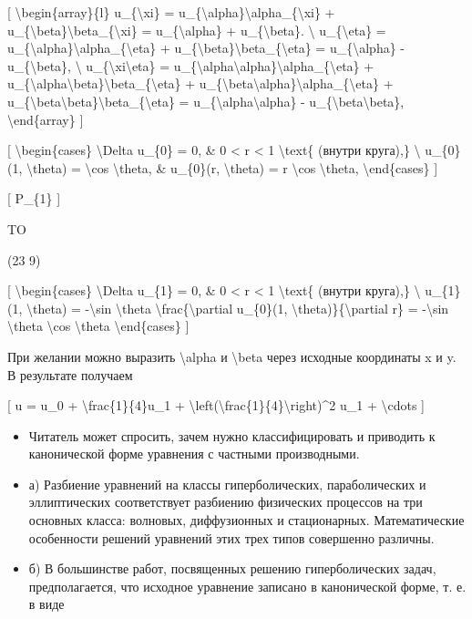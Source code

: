 \documentclass[
]{article}
\begin{document}
{[} \textbackslash begin\{array\}\{l\} u\_\{\textbackslash xi\} =
u\_\{\textbackslash alpha\}\textbackslash alpha\_\{\textbackslash xi\} +
u\_\{\textbackslash beta\}\textbackslash beta\_\{\textbackslash xi\} =
u\_\{\textbackslash alpha\} + u\_\{\textbackslash beta\}.
\textbackslash{} u\_\{\textbackslash eta\} =
u\_\{\textbackslash alpha\}\textbackslash alpha\_\{\textbackslash eta\}
+ u\_\{\textbackslash beta\}\textbackslash beta\_\{\textbackslash eta\}
= u\_\{\textbackslash alpha\} - u\_\{\textbackslash beta\},
\textbackslash{} u\_\{\textbackslash xi\textbackslash eta\} =
u\_\{\textbackslash alpha\textbackslash alpha\}\textbackslash alpha\_\{\textbackslash eta\}
+
u\_\{\textbackslash alpha\textbackslash beta\}\textbackslash beta\_\{\textbackslash eta\}
+
u\_\{\textbackslash beta\textbackslash alpha\}\textbackslash alpha\_\{\textbackslash eta\}
+
u\_\{\textbackslash beta\textbackslash beta\}\textbackslash beta\_\{\textbackslash eta\}
= u\_\{\textbackslash alpha\textbackslash alpha\} -
u\_\{\textbackslash beta\textbackslash beta\},
\textbackslash end\{array\} {]}

{[} \textbackslash begin\{cases\} \textbackslash Delta u\_\{0\} = 0, \&
0 \textless{} r \textless{} 1 \textbackslash text\{ (внутри круга),\}
\textbackslash{} u\_\{0\}(1, \textbackslash theta) = \textbackslash cos
\textbackslash theta, \& u\_\{0\}(r, \textbackslash theta) = r
\textbackslash cos \textbackslash theta, \textbackslash end\{cases\} {]}

{[} P\_\{1\} {]}

TO

(23 9)

{[} \textbackslash begin\{cases\} \textbackslash Delta u\_\{1\} = 0, \&
0 \textless{} r \textless{} 1 \textbackslash text\{ (внутри круга),\}
\textbackslash{} u\_\{1\}(1, \textbackslash theta) = -\textbackslash sin
\textbackslash theta \textbackslash frac\{\textbackslash partial
u\_\{0\}(1, \textbackslash theta)\}\{\textbackslash partial r\} =
-\textbackslash sin \textbackslash theta \textbackslash cos
\textbackslash theta \textbackslash end\{cases\} {]}

При желании можно выразить \textbackslash alpha и \textbackslash beta
через исходные координаты x и y. В результате получаем

{[} u = u\_0 + \textbackslash frac\{1\}\{4\}u\_1 +
\textbackslash left(\textbackslash frac\{1\}\{4\}\textbackslash right)\^{}2
u\_1 + \textbackslash cdots {]}

\begin{itemize}
\item
  Читатель может спросить, зачем нужно классифицировать и приводить к
  канонической форме уравнения с частными производными.
\item
  а) Разбиение уравнений на классы гиперболических, параболических и
  эллиптических соответствует разбиению физических процессов на три
  основных класса: волновых, диффузионных и стационарных. Математические
  особенности решений уравнений этих трех типов совершенно различны.
\item
  б) В большинстве работ, посвященных решению гиперболических задач,
  предполагается, что исходное уравнение записано в канонической форме,
  т. е. в виде
\end{itemize}
\end{document}
